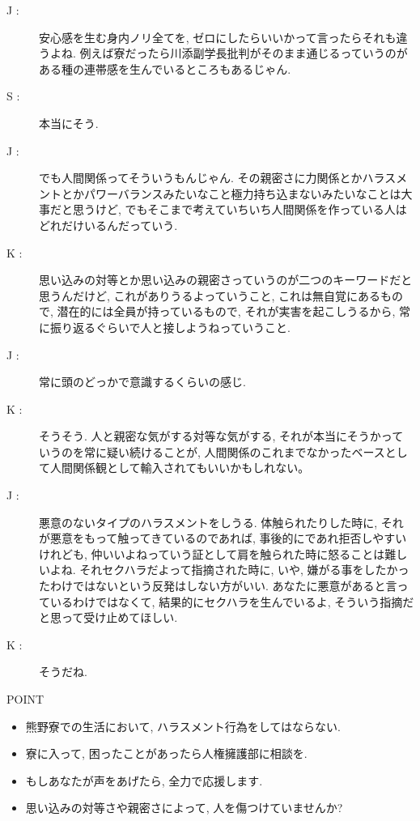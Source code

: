 \documentclass[10pt,b5jsbook,dvips,dvipdfmx,openany]{jsbook}
\theoremstyle{definition}
\begin{document}
\begin{description}
		\item[ J : ] 安心感を生む身内ノリ全てを, ゼロにしたらいいかって言ったらそれも違うよね. 例えば寮だったら川添副学長批判がそのまま通じるっていうのがある種の連帯感を生んでいるところもあるじゃん.

		\item[ S : ] 本当にそう.

		\item[ J : ] でも人間関係ってそういうもんじゃん. その親密さに力関係とかハラスメントとかパワーバランスみたいなこと極力持ち込まないみたいなことは大事だと思うけど, でもそこまで考えていちいち人間関係を作っている人はどれだけいるんだっていう.

		\item[ K : ] 思い込みの対等とか思い込みの親密さっていうのが二つのキーワードだと思うんだけど, これがありうるよっていうこと, これは無自覚にあるもので, 潜在的には全員が持っているもので, それが実害を起こしうるから, 常に振り返るぐらいで人と接しようねっていうこと.

		\item[ J : ] 常に頭のどっかで意識するくらいの感じ.

		\item[ K : ] そうそう. 人と親密な気がする対等な気がする, それが本当にそうかっていうのを常に疑い続けることが, 人間関係のこれまでなかったベースとして人間関係観として輸入されてもいいかもしれない｡

		\item[ J : ] 悪意のないタイプのハラスメントをしうる. 体触られたりした時に, それが悪意をもって触ってきているのであれば, 事後的にであれ拒否しやすいけれども, 仲いいよねっていう証として肩を触られた時に怒ることは難しいよね. それセクハラだよって指摘された時に, いや, 嫌がる事をしたかったわけではないという反発はしない方がいい. あなたに悪意があると言っているわけではなくて, 結果的にセクハラを生んでいるよ, そういう指摘だと思って受け止めてほしい.

		\item[ K : ] そうだね.
\normalsize
		\end{description}
\normalsize
		\begin{tcolorbox}
		POINT
		\begin{itemize}
		\item 熊野寮での生活において, ハラスメント行為をしてはならない.
		\item 寮に入って, 困ったことがあったら人権擁護部に相談を.
		\item もしあなたが声をあげたら, 全力で応援します.
		\item 思い込みの対等さや親密さによって, 人を傷つけていませんか?
		\end{itemize}
		\end{tcolorbox}
\end{document}
